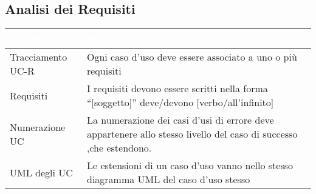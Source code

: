 \subsection{Analisi dei Requisiti}
{
    \setlength{\freewidth}{\dimexpr\textwidth-10\tabcolsep}
    \renewcommand{\arraystretch}{1.5}
    \centering
    \setlength{\aboverulesep}{0pt}
    \setlength{\belowrulesep}{0pt}
    \begin{longtable}{C{.5\freewidth} C{.5\freewidth}}
       \toprule
    \textcolor{white}{\textbf{Aspetto}}&
    \textcolor{white}{\textbf{Spiegazione}}\\
    \toprule
    \endhead

    Tracciamento UC-R & Ogni caso d'uso deve essere associato a uno o più requisiti \\
    Requisiti & I requisiti devono essere scritti nella forma “[soggetto]” deve/devono [verbo/all'infinito]  \\
    Numerazione UC & La numerazione dei casi d'usi di errore deve appartenere allo stesso livello del caso di successo ,che estendono.\\
    UML degli UC & Le estensioni di un caso d'uso vanno nello stesso diagramma UML del caso d'uso stesso \\
    
    \bottomrule
\end{longtable}
    
}